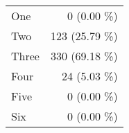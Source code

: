 \begin{tabular}{ l  r }
One & 0 (0.00 \%)\\
Two & 123 (25.79 \%)\\
Three & 330 (69.18 \%)\\
Four & 24 (5.03 \%)\\
Five & 0 (0.00 \%)\\
Six & 0 (0.00 \%)\\
\end{tabular}